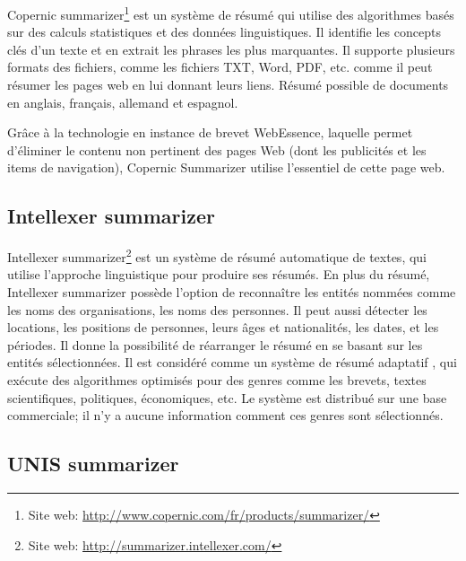 \documentclass[a4paper,12pt,oneside]{../use/ESIthesis}
\begin{document}
Copernic summarizer\footnote{Site web: \url{http://www.copernic.com/fr/products/summarizer/}}  est un système de résumé qui utilise des algorithmes basés sur des calculs statistiques et des données linguistiques. 
Il identifie les concepts clés d'un texte et en extrait les phrases les plus marquantes. 
Il supporte plusieurs formats des fichiers, comme les fichiers TXT, Word, PDF, etc. comme il peut résumer les pages web en lui donnant leurs liens. 
Résumé possible de documents en anglais, français, allemand et espagnol.

Grâce à la technologie en instance de brevet WebEssence, laquelle permet d'éliminer le contenu non pertinent des pages Web (dont les publicités et les items de navigation), Copernic Summarizer utilise l'essentiel de cette page web. 

\subsection{Intellexer summarizer}

Intellexer summarizer\footnote{Site web: \url{http://summarizer.intellexer.com/}} est un système de résumé automatique de textes, qui utilise l'approche linguistique pour produire ses résumés. 
En plus du résumé, Intellexer summarizer possède l'option de reconnaître les entités nommées comme les noms des organisations, les noms des personnes. 
Il peut aussi détecter les locations, les positions de personnes, leurs âges et nationalités, les dates, et les périodes. 
Il donne la possibilité de réarranger le résumé en se basant sur les entités sélectionnées. 
Il est considéré comme un système de résumé adaptatif \cite{10-yatsko-al}, qui exécute des algorithmes optimisés pour des genres comme les brevets, textes scientifiques, politiques, économiques, etc. 
Le système est distribué sur une base commerciale; il n'y a aucune information comment ces genres sont sélectionnés. 

\subsection{UNIS summarizer}
\end{document}

